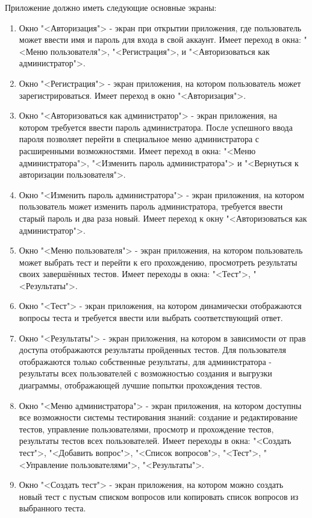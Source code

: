 Приложение должно иметь следующие основные экраны:
\begin{enumerate}
	\item Окно "<Авторизация"> - экран при открытии приложения, где пользователь может ввести имя и пароль для входа в свой аккаунт. Имеет переход в окна: "<Меню пользователя">, "<Регистрация">,  и "<Авторизоваться как администратор">.
	\item Окно "<Регистрация"> - экран приложения, на котором пользователь может зарегистрироваться. Имеет переход в окно "<Авторизация">.
	\item Окно "<Авторизоваться как администратор"> - экран приложения, на котором требуется ввести пароль администратора. После успешного ввода пароля позволяет перейти в специальное меню администратора с расширенными возможностями. Имеет переход в окна: "<Меню администратора">, "<Изменить пароль администратора"> и "<Вернуться к авторизации пользователя">.
	\item Окно "<Изменить пароль администратора"> - экран приложения, на котором пользователь может изменить пароль администратора, требуется ввести старый пароль и два раза новый. Имеет переход к окну "<Авторизоваться как администратор">.
	\item Окно "<Меню пользователя"> - экран приложения, на котором пользователь может выбрать тест и перейти к его прохождению, просмотреть результаты своих завершённых тестов. Имеет переходы в окна: "<Тест">, "<Результаты">.
	\item Окно "<Тест"> - экран приложения, на котором динамически отображаются вопросы теста и требуется ввести или выбрать соответствующий ответ.
	\item Окно "<Результаты"> - экран приложения, на котором в зависимости от прав доступа отображаются результаты пройденных тестов. Для пользователя отображаются только собственные результаты, для администратора - результаты всех пользователей с возможностью создания и выгрузки диаграммы, отображающей лучшие попытки прохождения тестов.
	\item Окно "<Меню администратора"> - экран приложения, на котором доступны все возможности системы тестирования знаний: создание и редактирование тестов, управление пользователями, просмотр и прохождение тестов, результаты тестов всех пользователей. Имеет переходы в окна: "<Создать тест">, "<Добавить вопрос">, "<Список вопросов">, "<Тест">, "<Управление пользователями">, "<Результаты">.
	\item Окно "<Создать тест"> - экран приложения, на котором можно создать новый тест с пустым списком вопросов или копировать список вопросов из выбранного теста. 

\end{enumerate}
